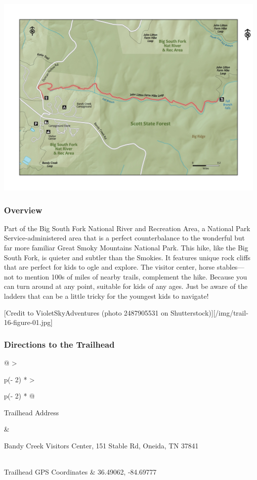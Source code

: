 \documentclass[
  letterpaper,
  DIV=11,
  numbers=noendperiod]{scrartcl}
\begin{document}
\includegraphics{maps/trail-16-map.jpeg}

\hypertarget{overview-15}{%
\subsubsection{Overview}\label{overview-15}}

Part of the Big South Fork National River and Recreation Area, a
National Park Service-administered area that is a perfect counterbalance
to the wonderful but far more familiar Great Smoky Mountains National
Park. This hike, like the Big South Fork, is quieter and subtler than
the Smokies. It features unique rock cliffs that are perfect for kids to
ogle and explore. The visitor center, horse stables---not to mention
100s of miles of nearby trails, complement the hike. Because you can
turn around at any point, suitable for kids of any ages. Just be aware
of the ladders that can be a little tricky for the youngest kids to
navigate!

{[}Credit to VioletSkyAdventures (photo 2487905531 on
Shutterstock){]}{[}/img/trail-16-figure-01.jpg{]}

\hypertarget{directions-to-the-trailhead-15}{%
\subsubsection{Directions to the
Trailhead}\label{directions-to-the-trailhead-15}}

\begin{longtable}[]{@{}
  >{\raggedright\arraybackslash}p{(\columnwidth - 2\tabcolsep) * }
  >{\raggedright\arraybackslash}p{(\columnwidth - 2\tabcolsep) * }@{}}
\toprule\noalign{}
\begin{minipage}[b]{\linewidth}\raggedright
Trailhead Address
\end{minipage} & \begin{minipage}[b]{\linewidth}\raggedright
Bandy Creek Visitors Center, 151 Stable Rd, Oneida, TN 37841
\end{minipage} \\
\midrule\noalign{}
\endhead
\bottomrule\noalign{}
\endlastfoot
Trailhead GPS Coordinates & 36.49062, -84.69777 \\
\end{longtable}
\end{document}
